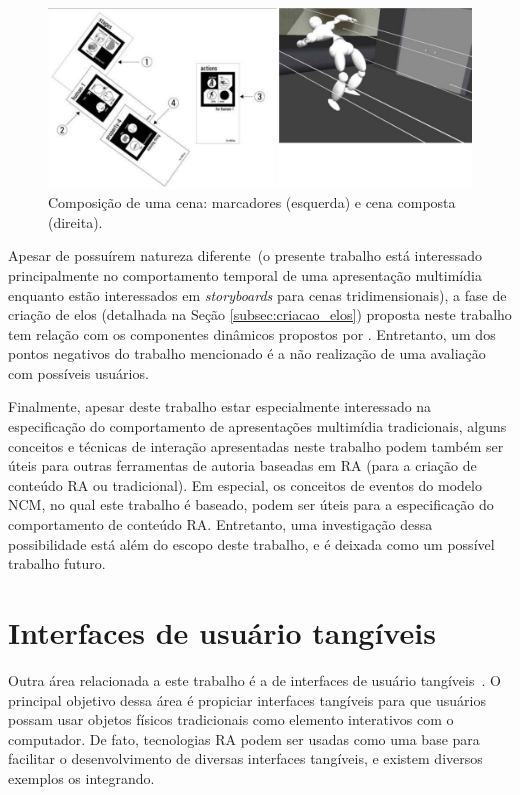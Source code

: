 \documentclass[../main.tex]{subfiles}
\begin{document}
\begin{figure}[!h]
\centering
\includegraphics[width=1\linewidth]{IMG/Relacionados/shin.png}
\caption{Composição de uma cena: marcadores (esquerda) e cena composta (direita).}
\label{fig:shin}
\end{figure}

Apesar de possuírem natureza diferente~(o presente trabalho está interessado principalmente no comportamento temporal de uma apresentação multimídia enquanto  estão interessados em \emph{storyboards} para cenas tridimensionais), a fase de criação de elos (detalhada na Seção \ref{subsec:criacao_elos}) proposta neste trabalho tem relação com os componentes dinâmicos propostos por . Entretanto, um dos pontos negativos do trabalho mencionado é a não realização de uma avaliação com possíveis usuários. 

Finalmente, apesar deste trabalho estar especialmente interessado na especificação do comportamento de apresentações multimídia tradicionais, alguns conceitos e técnicas de interação apresentadas neste trabalho podem também ser úteis para outras ferramentas de autoria baseadas em RA (para a criação de conteúdo RA ou tradicional). Em especial, os conceitos de eventos do modelo NCM, no qual este trabalho é baseado, podem ser úteis para a especificação do comportamento de conteúdo RA. Entretanto, uma investigação dessa possibilidade está além do escopo deste trabalho, e é deixada como um possível trabalho futuro. 

\section{Interfaces de usuário tangíveis}
\label{sec:interfaces_tangiveis}

Outra área relacionada a este trabalho é a de interfaces de usuário tangíveis~\cite{ishii_tangible_2008}. O principal objetivo dessa área é propiciar interfaces tangíveis para que usuários possam usar objetos físicos tradicionais como elemento interativos com o computador. De fato, tecnologias RA podem ser usadas como uma base para facilitar o desenvolvimento de diversas interfaces tangíveis, e existem diversos exemplos os integrando. 
\end{document}
